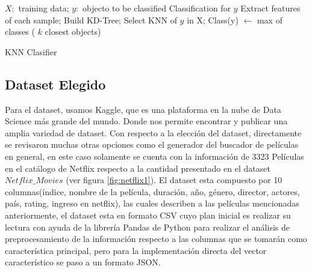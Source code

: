 \documentclass{article}
\begin{document}
            \begin{algorithm}[H]
                \begin{algorithmic}
                    \REQUIRE $X:$ training data; $y:$ objecto to be classified
                    \ENSURE Classification for $y$
                    \STATE Extract features of each sample;
                    \STATE Build KD-Tree;
                    \STATE Select KNN of $y$ in X;
                    \STATE Class(y) $\gets$ max of classes ( $k$ closest objects)
                \end{algorithmic}
                \caption{KNN Clasifier}
                \label{alg:KNNClasifier}
            \end{algorithm}
            
        \subsection{Dataset Elegido}
            Para el dataset, usamos Kaggle, que es una plataforma en la nube de Data Science más grande del mundo. Donde nos permite encontrar y publicar una amplia variedad de dataset.
            Con respecto a la elección del dataset, directamente se revisaron muchas otras opciones como el generador del buscador de películas en general, en este caso solamente se cuenta con la información de 3323 Películas en el catálogo de Netflix respecto a la cantidad presentado en el dataset $Netflix\_Movies$ \cite{kaggleNetflix} (ver figura \ref{fig:netflix1}). El dataset esta compuesto por 10 columnas(índice, nombre de la película, duración, año, género, director, actores, país, rating, ingreso en netflix), las cuales describen a las películas mencionadas anteriormente, el dataset esta en formato CSV cuyo plan inicial es realizar su lectura con ayuda de la librería Pandas de Python para realizar el análisis de preprocesamiento de la información respecto a las columnas que se tomarán como característica principal, pero para la implementación directa del vector característico se paso a un formato JSON.
            
\end{document}
